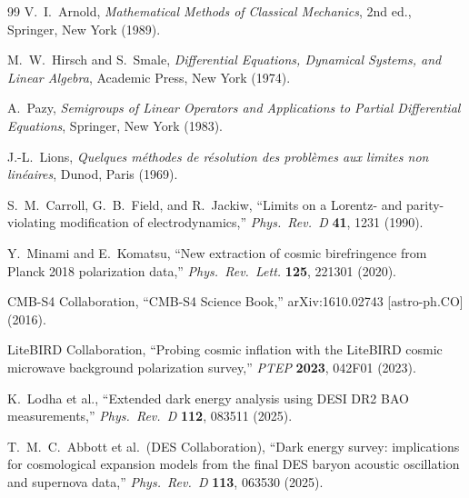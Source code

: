 \documentclass[12pt,a4paper]{article}
\theoremstyle{plain}
\theoremstyle{definition}
\theoremstyle{remark}
\begin{document}
\begin{thebibliography}{99}
V.~I.~Arnold,
\textit{Mathematical Methods of Classical Mechanics},
2nd ed., Springer, New York (1989).

M.~W.~Hirsch and S.~Smale,
\textit{Differential Equations, Dynamical Systems, and Linear Algebra},
Academic Press, New York (1974).

A.~Pazy,
\textit{Semigroups of Linear Operators and Applications to Partial Differential
Equations}, Springer, New York (1983).

J.-L.~Lions,
\textit{Quelques m\'{e}thodes de r\'{e}solution des probl\`{e}mes aux limites non
lin\'{e}aires}, Dunod, Paris (1969).

S.~M.~Carroll, G.~B.~Field, and R.~Jackiw,
``Limits on a Lorentz- and parity-violating modification of electrodynamics,''
\textit{Phys.\ Rev.\ D} \textbf{41}, 1231 (1990).

Y.~Minami and E.~Komatsu,
``New extraction of cosmic birefringence from Planck 2018 polarization data,''
\textit{Phys.\ Rev.\ Lett.} \textbf{125}, 221301 (2020).

CMB-S4 Collaboration,
``CMB-S4 Science Book,''
arXiv:1610.02743 [astro-ph.CO] (2016).

LiteBIRD Collaboration,
``Probing cosmic inflation with the LiteBIRD cosmic microwave background
polarization survey,''
\textit{PTEP} \textbf{2023}, 042F01 (2023).

K.~Lodha et al.,
``Extended dark energy analysis using DESI DR2 BAO measurements,''
\textit{Phys.\ Rev.\ D} \textbf{112}, 083511 (2025).

T.~M.~C.~Abbott et al.\ (DES Collaboration),
``Dark energy survey: implications for cosmological expansion models from the
final DES baryon acoustic oscillation and supernova data,''
\textit{Phys.\ Rev.\ D} \textbf{113}, 063530 (2025).

\end{thebibliography}
\end{document}
